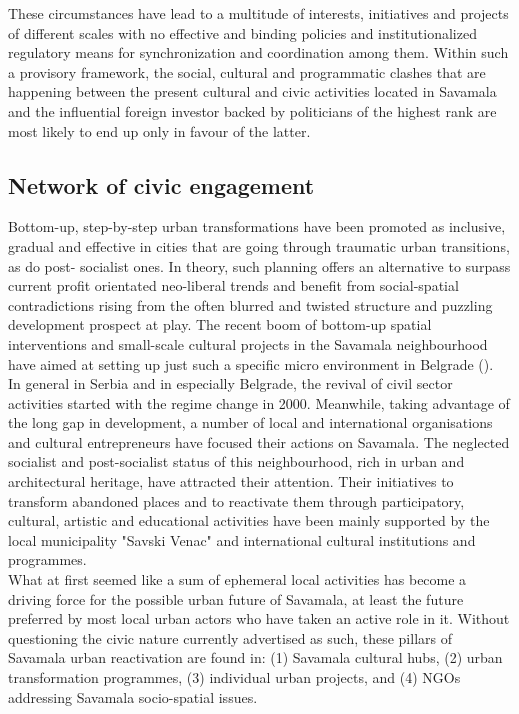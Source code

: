 \documentclass[11pt]{report}
\begin{document}
These circumstances have lead to a multitude of interests, initiatives and projects of different scales with no effective and binding policies and institutionalized regulatory means for synchronization and coordination among them. Within such a provisory framework, the social, cultural and programmatic clashes that are happening between the present cultural and civic activities located in Savamala and the influential foreign investor backed by politicians of the highest rank are most likely to end up only in favour of the latter.

\subsection{Network of civic engagement}

Bottom-up, step-by-step urban transformations have been promoted as inclusive, gradual and effective in cities that are going through traumatic urban transitions, as do post- socialist ones. In theory, such planning offers an alternative to surpass current profit orientated
neo-liberal trends and benefit from social-spatial contradictions rising from the often blurred and twisted structure and puzzling development prospect at play. The recent boom of bottom-up spatial interventions and small-scale cultural projects in the Savamala neighbourhood have aimed at setting up just such a specific micro environment in Belgrade (\cite{(Urban Incubator Belgrade Report 2013)}).
\\

In general in Serbia and in especially Belgrade, the revival of civil sector activities started with the regime change in 2000. Meanwhile, taking advantage of the long gap in development, a number of local and international organisations and cultural entrepreneurs have focused their actions on Savamala. The neglected socialist and post-socialist status of this neighbourhood, rich in urban and architectural heritage, have attracted their attention. Their initiatives to transform abandoned places and to reactivate them through participatory, cultural, artistic and educational activities have been mainly supported by the local municipality  "Savski Venac" and international cultural institutions and programmes.
\\

What at first seemed like a sum of ephemeral local activities has become a driving force for the possible urban future of Savamala, at least the future preferred by most local urban actors who have taken an active role in it.
Without questioning the civic nature currently advertised as such, these pillars of Savamala urban reactivation are found in:
(1) Savamala cultural hubs,
(2) urban transformation programmes,
(3) individual urban projects, 
and
(4) NGOs addressing Savamala socio-spatial issues.
\\
\end{document}

